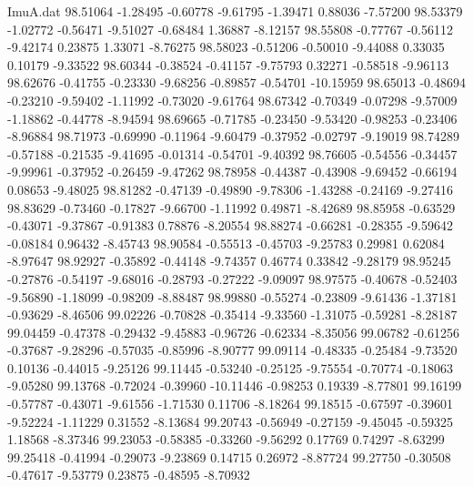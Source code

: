 \begin{filecontents}{ImuA.dat}
  98.51064   -1.28495   -0.60778   -9.61795   -1.39471    0.88036   -7.57200
  98.53379   -1.02772   -0.56471   -9.51027   -0.68484    1.36887   -8.12157
  98.55808   -0.77767   -0.56112   -9.42174    0.23875    1.33071   -8.76275
  98.58023   -0.51206   -0.50010   -9.44088    0.33035    0.10179   -9.33522
  98.60344   -0.38524   -0.41157   -9.75793    0.32271   -0.58518   -9.96113
  98.62676   -0.41755   -0.23330   -9.68256   -0.89857   -0.54701  -10.15959
  98.65013   -0.48694   -0.23210   -9.59402   -1.11992   -0.73020   -9.61764
  98.67342   -0.70349   -0.07298   -9.57009   -1.18862   -0.44778   -8.94594
  98.69665   -0.71785   -0.23450   -9.53420   -0.98253   -0.23406   -8.96884
  98.71973   -0.69990   -0.11964   -9.60479   -0.37952   -0.02797   -9.19019
  98.74289   -0.57188   -0.21535   -9.41695   -0.01314   -0.54701   -9.40392
  98.76605   -0.54556   -0.34457   -9.99961   -0.37952   -0.26459   -9.47262
  98.78958   -0.44387   -0.43908   -9.69452   -0.66194    0.08653   -9.48025
  98.81282   -0.47139   -0.49890   -9.78306   -1.43288   -0.24169   -9.27416
  98.83629   -0.73460   -0.17827   -9.66700   -1.11992    0.49871   -8.42689
  98.85958   -0.63529   -0.43071   -9.37867   -0.91383    0.78876   -8.20554
  98.88274   -0.66281   -0.28355   -9.59642   -0.08184    0.96432   -8.45743
  98.90584   -0.55513   -0.45703   -9.25783    0.29981    0.62084   -8.97647
  98.92927   -0.35892   -0.44148   -9.74357    0.46774    0.33842   -9.28179
  98.95245   -0.27876   -0.54197   -9.68016   -0.28793   -0.27222   -9.09097
  98.97575   -0.40678   -0.52403   -9.56890   -1.18099   -0.98209   -8.88487
  98.99880   -0.55274   -0.23809   -9.61436   -1.37181   -0.93629   -8.46506
  99.02226   -0.70828   -0.35414   -9.33560   -1.31075   -0.59281   -8.28187
  99.04459   -0.47378   -0.29432   -9.45883   -0.96726   -0.62334   -8.35056
  99.06782   -0.61256   -0.37687   -9.28296   -0.57035   -0.85996   -8.90777
  99.09114   -0.48335   -0.25484   -9.73520    0.10136   -0.44015   -9.25126
  99.11445   -0.53240   -0.25125   -9.75554   -0.70774   -0.18063   -9.05280
  99.13768   -0.72024   -0.39960  -10.11446   -0.98253    0.19339   -8.77801
  99.16199   -0.57787   -0.43071   -9.61556   -1.71530    0.11706   -8.18264
  99.18515   -0.67597   -0.39601   -9.52224   -1.11229    0.31552   -8.13684
  99.20743   -0.56949   -0.27159   -9.45045   -0.59325    1.18568   -8.37346
  99.23053   -0.58385   -0.33260   -9.56292    0.17769    0.74297   -8.63299
  99.25418   -0.41994   -0.29073   -9.23869    0.14715    0.26972   -8.87724
  99.27750   -0.30508   -0.47617   -9.53779    0.23875   -0.48595   -8.70932

\end{filecontents}
